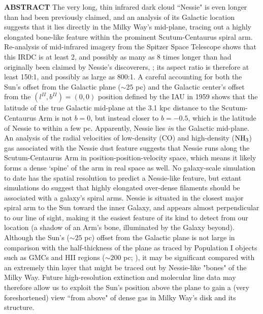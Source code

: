 {\bf ABSTRACT} The very long, thin infrared dark cloud ``Nessie" is even longer than had been previously claimed, and an analysis of its Galactic location suggests that it lies directly in the Milky Way's mid-plane, tracing out a highly elongated bone-like feature within the prominent Scutum-Centaurus spiral arm. Re-analysis of mid-infrared imagery from the Spitzer Space Telescope shows that this IRDC is at least 2, and possibly as many as 8 times longer than had originally been claimed by Nessie's discoverers, \citet{Jackson2010}; its aspect ratio is therefore at least 150:1, and possibly as large as 800:1. A careful accounting for both the Sun's offset from the Galactic plane ($\sim 25$ pc) and the Galactic center's offset from the $(l^{II},b^{II})=(0,0)$ position defined by the IAU in 1959 shows that the latitude of the true Galactic mid-plane at the 3.1 kpc distance to the Scutum-Centaurus Arm is not $b=0$, but instead closer to $b=-0.5$, which is the latitude of Nessie to within a few pc. Apparently, Nessie lies {\it in} the Galactic mid-plane. An analysis of the radial velocities of low-density (CO) and high-density (${\rm NH}_3$) gas associated with the Nessie dust feature suggests that Nessie runs along the Scutum-Centaurus Arm in position-position-velocity space, which means it likely forms a dense `spine' of the arm in real space as well. No galaxy-scale simulation to date has the spatial resolution to predict a Nessie-like feature, but extant simulations do suggest that highly elongated over-dense filaments should be associated with a galaxy's spiral arms. Nessie is situated in the closest major spiral arm to the Sun toward the inner Galaxy, and appears almost perpendicular to our line of sight, making it the easiest feature of its kind to detect from our location (a shadow of an Arm's bone, illuminated by the Galaxy beyond). Although the Sun's ($\sim 25$ pc) offset from the Galactic plane is not large in comparison with the half-thickness of the plane as traced by Population I objects such as GMCs and HII regions ($\sim 200$ pc; \citet{2013A&ARv..21...61R}), it may be significant compared with an extremely thin layer that might be traced out by Nessie-like "bones" of the Milky Way. Future high-resolution extinction and molecular line data may therefore allow us to exploit the Sun's position above the plane to gain a (very foreshortened) view ``from above" of dense gas in Milky Way's disk and its structure. 
